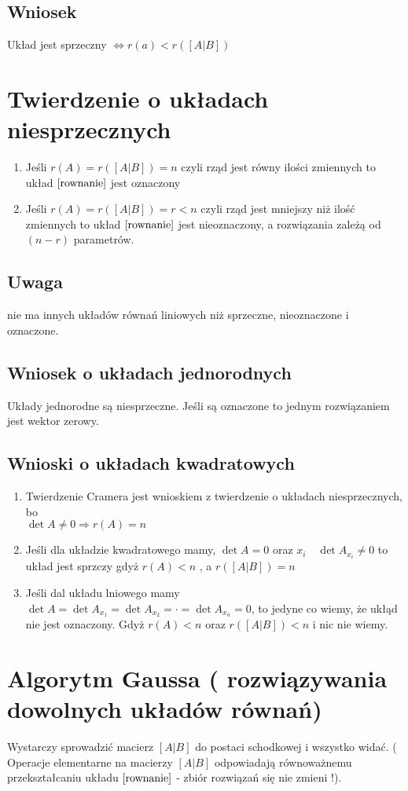 \documentclass[11pt]{article}
\begin{document}
\subsection{Wniosek}
Układ jest sprzeczny $\iff r(a) < r([A|B])$

\section{Twierdzenie o układach niesprzecznych}
\begin{enumerate}
\item{Jeśli $r(A) = r([A|B]) = n$ czyli rząd jest równy ilości zmiennych to układ $\eqref{rownanie}$ jest oznaczony}
\item{Jeśli $r(A) = r([A|B]) = r < n$ czyli rząd jest mniejszy niż ilość zmiennych to układ $\eqref{rownanie}$ jest nieoznaczony, a rozwiązania zależą od $(n-r)$ parametrów.}
\end{enumerate}
\subsection{Uwaga}
nie ma innych układów równań liniowych niż sprzeczne, nieoznaczone i oznaczone.

\subsection{Wniosek o układach jednorodnych}
Układy jednorodne są niesprzeczne. Jeśli są oznaczone to jednym rozwiązaniem jest wektor zerowy. 

\subsection{Wnioski o układach kwadratowych}
\begin{enumerate}
\item{Twierdzenie Cramera jest wnioskiem z twierdzenie o układach niesprzecznych, bo \\$\det{A} \not = 0 \Rightarrow r(A) = n$}
\item{Jeśli dla układzie kwadratowego mamy, $\det{A} = 0$ oraz $x_i \quad \det{A_{x_i}} \not = 0$ to układ jest sprzczy gdyż $r(A) < n$ , a $r([A|B]) = n$ }
\item{Jeśli dal układu lniowego mamy $ \det{A} = \det{A_{x_1}} = \det{A_{x_2}} = \cdot = \det{A_{x_n}} = 0$, to jedyne co wiemy, że ukłąd nie jest oznaczony. Gdyż
$r(A) < n$ oraz $r([A|B]) < n$ i nic nie wiemy.}
\end{enumerate}
\section{Algorytm Gaussa ( rozwiązywania dowolnych układów równań)}
Wystarczy sprowadzić macierz $[A|B]$ do postaci schodkowej i wszystko widać.  ( Operacje elementarne na macierzy $[A|B]$ odpowiadają równoważnemu przekształcaniu układu $\eqref{rownanie}$ - zbiór rozwiązań się nie zmieni !).
\end{document}
